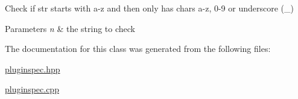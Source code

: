 Check if str starts with a-\/z and then only has chars a-\/z, 0-\/9 or underscore (\+\_\+) 


\begin{DoxyParams}{Parameters}
{\em n} & the string to check \\
\hline
\end{DoxyParams}


The documentation for this class was generated from the following files\+:\begin{DoxyCompactItemize}
\item 
\mbox{\hyperlink{pluginspec_8hpp}{pluginspec.\+hpp}}\item 
\mbox{\hyperlink{pluginspec_8cpp}{pluginspec.\+cpp}}\end{DoxyCompactItemize}
